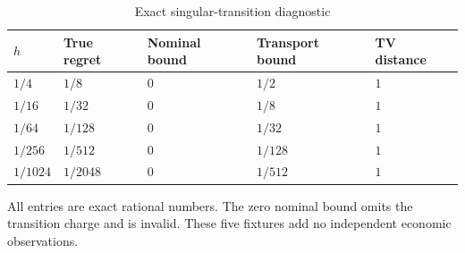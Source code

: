 \begin{table}[htbp]
\centering
\caption{Exact singular-transition diagnostic}\label{tab:transport90}
\begin{tabular}{lllll}
\toprule
$h$ & True regret & Nominal bound & Transport bound & TV distance \\
\midrule
$1/4$ & $1/8$ & $0$ & $1/2$ & $1$ \\
$1/16$ & $1/32$ & $0$ & $1/8$ & $1$ \\
$1/64$ & $1/128$ & $0$ & $1/32$ & $1$ \\
$1/256$ & $1/512$ & $0$ & $1/128$ & $1$ \\
$1/1024$ & $1/2048$ & $0$ & $1/512$ & $1$ \\
\bottomrule
\end{tabular}
\par\smallskip
{\footnotesize All entries are exact rational numbers. The zero nominal bound omits the transition charge and is invalid. These five fixtures add no independent economic observations.}
\end{table}
